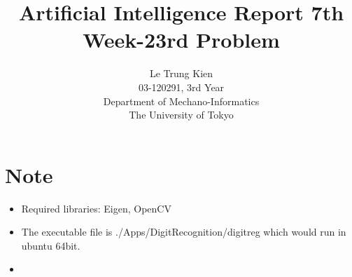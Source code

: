 \documentclass[a4paper, 11pt]{article}
\begin{document}
\title{Artificial Intelligence Report 7th Week-23rd Problem}
\author{Le Trung Kien\\ 
  03-120291, 3rd Year \\
  Department of Mechano-Informatics \\ 
  The University of Tokyo
}
\maketitle
\section*{Note}
\begin{itemize}
\item Required libraries: Eigen, OpenCV
\item The executable file is ./Apps/DigitRecognition/digitreg which would run in ubuntu 64bit.
\item 
\end{itemize}
\newpage
\end{document}
